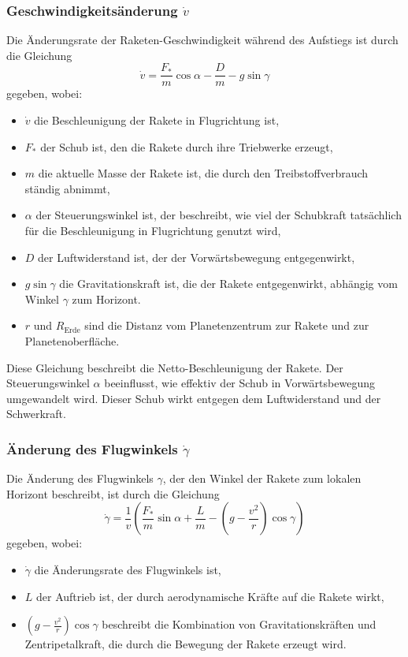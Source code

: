 \subsubsection{Geschwindigkeitsänderung \(\dot{v}\)}
Die Änderungsrate der Raketen-Geschwindigkeit während des Aufstiegs
ist durch die Gleichung
\[
\dot{v} = \frac{F_*}{m} \cos \alpha - \frac{D}{m} - g \sin \gamma
\]
gegeben, wobei:
\begin{itemize}
	\item \(\dot{v}\) die Beschleunigung der Rakete in Flugrichtung ist,
	\item \(F_*\) der Schub ist, den die Rakete durch ihre Triebwerke erzeugt,
%
	\item \(m\) die aktuelle Masse der Rakete ist, die durch den Treibstoffverbrauch ständig abnimmt,
	\item \(\alpha\) der Steuerungswinkel ist, der beschreibt, wie viel der Schubkraft tatsächlich für die Beschleunigung in Flugrichtung genutzt wird,
	\item \(D\) der Luftwiderstand ist, der der Vorwärtsbewegung entgegenwirkt,
%
	\item \(g \sin \gamma\) die Gravitationskraft ist, die der Rakete entgegenwirkt, abhängig vom Winkel \(\gamma\) zum Horizont.
    \item \(r\) und \(R_{\text{Erde}}\) sind die Distanz vom Planetenzentrum zur Rakete und zur Planetenoberfläche.
\end{itemize}
Diese Gleichung beschreibt die Netto-Beschleunigung der Rakete. Der Steuerungswinkel \(\alpha\) beeinflusst, wie effektiv der Schub in Vorwärtsbewegung umgewandelt wird. Dieser Schub wirkt entgegen dem Luftwiderstand und der Schwerkraft. 


\subsubsection{Änderung des Flugwinkels \(\dot{\gamma}\)}
Die Änderung des Flugwinkels \(\gamma\), der den Winkel der Rakete zum lokalen Horizont beschreibt, ist durch die Gleichung
\[
\dot{\gamma} = \frac{1}{v}\left( \frac{F_*}{m} \sin \alpha + \frac{L}{m} - \left(g - \frac{v^2}{r}\right) \cos \gamma \right)
\]
gegeben, wobei:
\begin{itemize}
	\item \(\dot{\gamma}\) die Änderungsrate des Flugwinkels ist,
	\item \(L\) der Auftrieb ist, der durch aerodynamische Kräfte auf die Rakete wirkt,
	\item \(\left(g - \frac{v^2}{r}\right) \cos \gamma\) beschreibt die Kombination von Gravitationskräften und Zentripetalkraft, die durch die Bewegung der Rakete erzeugt wird.
\end{itemize}


